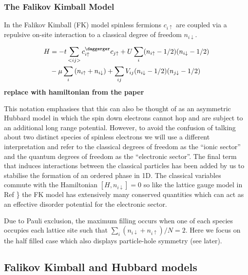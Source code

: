 \hypertarget{the-falikov-kimball-model}{%
\subsubsection{The Falikov Kimball Model}\label{the-falikov-kimball-model}}

In the Falikov Kimball (FK) model spinless fermions \(c_{i\uparrow}\) are coupled via a repulsive on-site interaction to a classical degree of freedom \(n_{i\downarrow}\).

\[\begin{aligned}
H &= -t \sum_{<ij>} c^\daggerger_{i\uparrow}c_{j\uparrow} + U \sum_{i} (n_{i \uparrow} - 1/2)( n_{i\downarrow} - 1/2) \\
       & - \mu \sum_i \left( n_{i \uparrow} + n_{i \downarrow} \right) + \sum_{ij} V_{ij} (n_{i\downarrow} - 1/2)(n_{j\downarrow} - 1/2) 
\end{aligned}\] \textbf{replace with hamiltonian from the paper}

This notation emphasises that this can also be thought of as an asymmetric Hubbard model in which the spin down electrons cannot hop and are subject to an additional long range potential. However, to avoid the confusion of talking about two distinct species of spinless electrons we will use a different interpretation and refer to the classical degrees of freedom as the ``ionic sector'' and the quantum degrees of freedom as the ``electronic sector''. The final term that induces interactions between the classical particles has been added by us to stabilise the formation of an ordered phase in 1D. The classical variables commute with the Hamiltonian \([H, n_{i\downarrow}] = 0\) so like the lattice gauge model in Ref \textcite{smith_disorder-free_2017}\} the FK model has extensively many conserved quantities which can act as an effective disorder potential for the electronic sector.

Due to Pauli exclusion, the maximum filling occurs when one of each species occupies each lattice site such that \(\sum_i (n_{i\downarrow} + n_{i\uparrow} )/ N = 2\). Here we focus on the half filled case which also displays particle-hole symmetry (see later).

\hypertarget{falikov-kimball-and-hubbard-models}{%
\subsection{Falikov Kimball and Hubbard models}\label{falikov-kimball-and-hubbard-models}}

